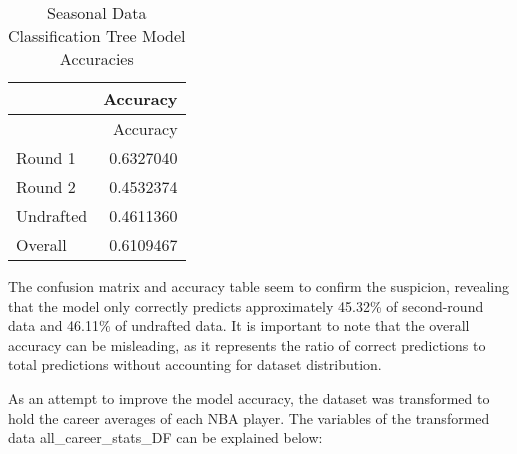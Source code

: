 \documentclass[
]{article}
\begin{document}
\begin{longtable}[]{@{}lr@{}}
\caption{Seasonal Data Classification Tree Model
Accuracies}\tabularnewline
\toprule\noalign{}
& Accuracy \\
\midrule\noalign{}
\endfirsthead
\toprule\noalign{}
& Accuracy \\
\midrule\noalign{}
\endhead
\bottomrule\noalign{}
\endlastfoot
Round 1 & 0.6327040 \\
Round 2 & 0.4532374 \\
Undrafted & 0.4611360 \\
Overall & 0.6109467 \\
\end{longtable}

The confusion matrix and accuracy table seem to confirm the suspicion,
revealing that the model only correctly predicts approximately 45.32\%
of second-round data and 46.11\% of undrafted data. It is important to
note that the overall accuracy can be misleading, as it represents the
ratio of correct predictions to total predictions without accounting for
dataset distribution.

As an attempt to improve the model accuracy, the dataset was transformed
to hold the career averages of each NBA player. The variables of the
transformed data all\_career\_stats\_DF can be explained below:
\end{document}
